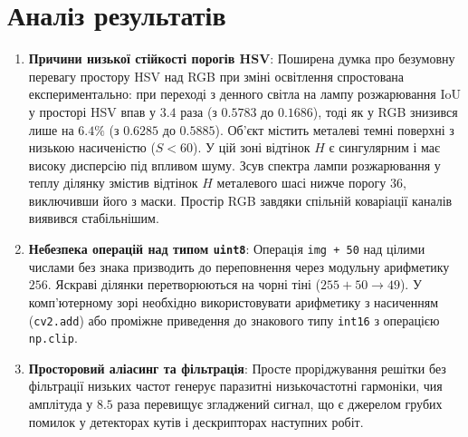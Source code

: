 \documentclass[14pt, a4paper]{extarticle}
\begin{document}
\section{Аналіз результатів}
\begin{enumerate}
    \item \textbf{Причини низької стійкості порогів HSV}:
    Поширена думка про безумовну перевагу простору HSV над RGB при зміні освітлення спростована експериментально: при переході з денного світла на лампу розжарювання $\text{IoU}$ у просторі HSV впав у $3.4$ раза (з $0.5783$ до $0.1686$), тоді як у RGB знизився лише на $6.4\%$ (з $0.6285$ до $0.5885$). Об'єкт містить металеві темні поверхні з низькою насиченістю ($S < 60$). У цій зоні відтінок $H$ є сингулярним і має високу дисперсію під впливом шуму. Зсув спектра лампи розжарювання у теплу ділянку змістив відтінок $H$ металевого шасі нижче порогу $36$, виключивши його з маски. Простір RGB завдяки спільній коваріації каналів виявився стабільнішим.

    \item \textbf{Небезпека операцій над типом \texttt{uint8}}:
    Операція \texttt{img + 50} над цілими числами без знака призводить до переповнення через модульну арифметику $256$. Яскраві ділянки перетворюються на чорні тіні ($255 + 50 \to 49$). У комп'ютерному зорі необхідно використовувати арифметику з насиченням (\texttt{cv2.add}) або проміжне приведення до знакового типу \texttt{int16} з операцією \texttt{np.clip}.

    \item \textbf{Просторовий аліасинг та фільтрація}:
    Просте проріджування решітки без фільтрації низьких частот генерує паразитні низькочастотні гармоніки, чия амплітуда у $8.5$ раза перевищує згладжений сигнал, що є джерелом грубих помилок у детекторах кутів і дескрипторах наступних робіт.
\end{enumerate}
\end{document}
